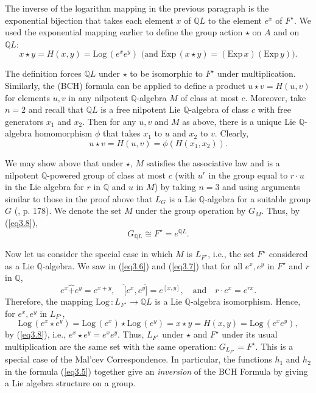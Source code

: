 \documentclass[mathscr]{amsart}
\theoremstyle{theorem}
\theoremstyle{definition}
\numberwithin{equation}{section}
\def \({\left(}
\def \){\right)}
\def \Exp{\text{Exp}\,}
\def \Log{\text{Log}\,}
\begin{document}
The inverse of the logarithm mapping in the previous paragraph is
the exponential bijection that takes each element $x$ of
$\mathbb{Q}L$ to the element $e^x$ of $F^\star$.  We used the
exponential mapping earlier to define the group action $\star$ on
$A$ and on $\mathbb{Q}L$:
\begin{equation}\label{eq3.8}
x\star y =H(x,y)=\Log\(e^xe^y\)\text{ (and }\Exp(x\star y)=(\Exp
x)(\Exp y)\text{)}.
\end{equation}

The definition forces $\mathbb{Q}L$ under $\star$ to be isomorphic
to $F^\star$ under multiplication.  Similarly, the (BCH) formula
 can be applied to define a product $u\star
v=H(u,v)$ for elements $u,v$ in any nilpotent $\mathbb{Q}$-algebra
$M$ of class at most $c$.  Moreover, take $n=2$ and recall that
$\mathbb{Q}L$ is a free nilpotent Lie $\mathbb{Q}$-algebra of class
$c$ with free generators $x_1$ and $x_2$.  Then for any $u,v$ and
$M$ as above, there is a unique Lie $\mathbb{Q}$-algebra
homomorphism $\phi$ that takes $x_1$ to $u$ and $x_2$ to $v$.
Clearly,
$$
u\star v=H(u,v)=\phi\(H\(x_1,x_2\)\).
$$

We may show above that under $\star$, $M$ satisfies the associative
law and is a nilpotent $\mathbb{Q}$-powered group of class at most
$c$ (with $u^r$ in the group equal to $r\cdot u$ in the Lie algebra
for $r$ in $\mathbb{Q}$ and $u$ in $M$) by taking $n=3$ and using
arguments similar to those in the proof above that $L_G$ is a Lie
$\mathbb{Q}$-algebra for a suitable group $G$ (\cite{Kh}, p. 178).
We denote the set $M$ under the group operation by $G_M$.  Thus, by
(\ref{eq3.8}),
$$
G_{\mathbb{Q}L}\cong F^\star = e^{\mathbb{Q}L}.
$$

Now let us consider the special case in which $M$ is
$L_{F^\star}$,%
i.e., the set $F^\star$ considered as a Lie $\mathbb{Q}$-algebra. We
saw in (\ref{eq3.6}) and (\ref{eq3.7}) that for all $e^x,e^y$ in
$F^\star$ and $r$ in $\mathbb{Q}$,
$$
e^x\hat+e^y=e^{x+y},\quad
\hat[e^x,e^y\hat]=e^{[x,y]},\quad\text{and}\quad r\cdot e^x=e^{rx}.
$$
Therefore, the mapping $\Log:L_{F^\star}\to\mathbb{Q}L$ is a Lie
$\mathbb{Q}$-algebra isomorphism.  Hence, for $e^x,e^y$ in
$L_{F^{\star}}$,
$$
\Log\(e^x\star e^y\)=\Log\(e^x\)\star\Log\(e^y\)=x\star y
=H(x,y)=\Log\(e^xe^y\),
$$
by (\ref{eq3.8}), i.e., $e^x\star e^y=e^xe^y$.  Thus, $L_{F^\star}$
under $\star$ and $F^\star$ under its usual multiplication are the
same set with the same operation: $G_{L_{F^\star}}=F^\star$. This is
a special case of the Mal'cev
Correspondence. %
In particular, the functions $h_1$ and $h_2$ in the formula
(\ref{eq3.5}) together give an {\it inversion} of the BCH Formula by
giving a Lie algebra structure on a group.
\end{document}
